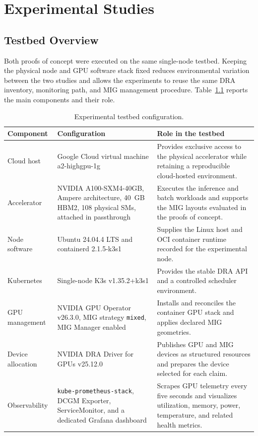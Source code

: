 \chapter{Experimental Studies}
\label{chap:implementation}

\section{Testbed Overview}
\label{sec:testbed-overview}

Both proofs of concept were executed on the same single-node testbed. Keeping the physical node and GPU software stack fixed reduces environmental variation between the two studies and allows the experiments to reuse the same DRA inventory, monitoring path, and MIG management procedure. Table~\ref{tab:testbed-overview} reports the main components and their role.

\begin{table}[htbp]
    \centering
    \small
    \caption{Experimental testbed configuration.}
    \label{tab:testbed-overview}
    \begin{tabularx}{\textwidth}{p{}XX}
        \toprule
        \textbf{Component} & \textbf{Configuration} & \textbf{Role in the testbed} \\
        \midrule
        Cloud host & Google Cloud virtual machine a2-highgpu-1g & Provides exclusive access to the physical accelerator while retaining a reproducible cloud-hosted environment. \\
        Accelerator & NVIDIA A100-SXM4-40GB, Ampere architecture, 40~GB HBM2, 108 physical SMs, attached in passthrough & Executes the inference and batch workloads and supports the MIG layouts evaluated in the proofs of concept. \\
        Node software & Ubuntu 24.04.4 LTS and containerd 2.1.5-k3s1 & Supplies the Linux host and OCI container runtime recorded for the experimental node. \\
        Kubernetes & Single-node K3s v1.35.2+k3s1 & Provides the stable DRA API and a controlled scheduler environment. \\
        GPU management & NVIDIA GPU Operator v26.3.0, MIG strategy \texttt{mixed}, MIG Manager enabled & Installs and reconciles the container GPU stack and applies declared MIG geometries. \\
        Device allocation & NVIDIA DRA Driver for GPUs v25.12.0 & Publishes GPU and MIG devices as structured resources and prepares the device selected for each claim. \\
        Observability & \texttt{kube-prometheus-stack}, DCGM Exporter, ServiceMonitor, and a dedicated Grafana dashboard & Scrapes GPU telemetry every five seconds and visualizes utilization, memory, power, temperature, and related health metrics. \\
        \bottomrule
    \end{tabularx}
\end{table}

